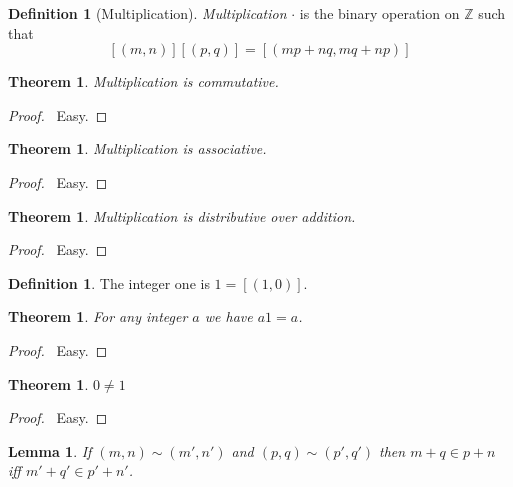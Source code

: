 \documentclass{report}
\let\qed\relax
\newtheorem{lemma}[axiom]{Lemma}
\newtheorem{theorem}[axiom]{Theorem}
\theoremstyle{definition}
\newtheorem{definition}[axiom]{Definition}
\begin{document}
    \begin{definition}[Multiplication]
        \emph{Multiplication} $\cdot$ is the binary operation on $\mathbb{Z}$ such that
        \[ [(m,n)][(p,q)] = [(mp+nq,mq+np)] \]
    \end{definition}

    \begin{theorem}
        Multiplication is commutative.
    \end{theorem}

    \begin{proof}
        \pf\ Easy. \qed
    \end{proof}

    \begin{theorem}
        Multiplication is associative.
    \end{theorem}

    \begin{proof}
        \pf\ Easy. \qed
    \end{proof}

    \begin{theorem}
        Multiplication is distributive over addition.
    \end{theorem}

    \begin{proof}
        \pf\ Easy. \qed
    \end{proof}

    \begin{definition}
        The integer one is $1 = [(1,0)]$.
    \end{definition}

    \begin{theorem}
        For any integer $a$ we have $a1= a$.
    \end{theorem}

    \begin{proof}
        \pf\ Easy. \qed
    \end{proof}

    \begin{theorem}
        $0 \neq 1$
    \end{theorem}

    \begin{proof}
        \pf\ Easy. \qed
    \end{proof}

    \begin{lemma}
        If $(m,n) \sim (m',n')$ and $(p,q) \sim (p',q')$ then $m + q \in p + n$ iff
        $m' + q' \in p' + n'$.
    \end{lemma}
\end{document}
